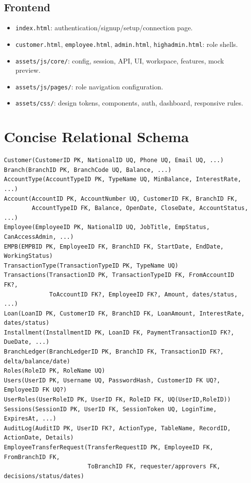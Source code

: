 \documentclass[11pt,a4paper,oneside]{report}
\newcommand{\codepath}[1]{\nolinkurl{#1}}
\begin{document}
\section{Frontend}
\begin{itemize}
\item \codepath{index.html}: authentication/signup/setup/connection page.
\item \codepath{customer.html}, \codepath{employee.html}, \codepath{admin.html}, \codepath{highadmin.html}: role shells.
\item \codepath{assets/js/core/}: config, session, API, UI, workspace, features, mock preview.
\item \codepath{assets/js/pages/}: role navigation configuration.
\item \codepath{assets/css/}: design tokens, components, auth, dashboard, responsive rules.
\end{itemize}

\chapter{Concise Relational Schema}
\small
\begin{verbatim}
Customer(CustomerID PK, NationalID UQ, Phone UQ, Email UQ, ...)
Branch(BranchID PK, BranchCode UQ, Balance, ...)
AccountType(AccountTypeID PK, TypeName UQ, MinBalance, InterestRate, ...)
Account(AccountID PK, AccountNumber UQ, CustomerID FK, BranchID FK,
        AccountTypeID FK, Balance, OpenDate, CloseDate, AccountStatus, ...)
Employee(EmployeeID PK, NationalID UQ, JobTitle, EmpStatus, CanAccessAdmin, ...)
EMPB(EMPBID PK, EmployeeID FK, BranchID FK, StartDate, EndDate, WorkingStatus)
TransactionType(TransactionTypeID PK, TypeName UQ)
Transactions(TransactionID PK, TransactionTypeID FK, FromAccountID FK?,
             ToAccountID FK?, EmployeeID FK?, Amount, dates/status, ...)
Loan(LoanID PK, CustomerID FK, BranchID FK, LoanAmount, InterestRate, dates/status)
Installment(InstallmentID PK, LoanID FK, PaymentTransactionID FK?, DueDate, ...)
BranchLedger(BranchLedgerID PK, BranchID FK, TransactionID FK?, delta/balance/date)
Roles(RoleID PK, RoleName UQ)
Users(UserID PK, Username UQ, PasswordHash, CustomerID FK UQ?, EmployeeID FK UQ?)
UserRoles(UserRoleID PK, UserID FK, RoleID FK, UQ(UserID,RoleID))
Sessions(SessionID PK, UserID FK, SessionToken UQ, LoginTime, ExpiresAt, ...)
AuditLog(AuditID PK, UserID FK?, ActionType, TableName, RecordID, ActionDate, Details)
EmployeeTransferRequest(TransferRequestID PK, EmployeeID FK, FromBranchID FK,
                        ToBranchID FK, requester/approvers FK, decisions/status/dates)
\end{verbatim}
\normalsize
\end{document}
